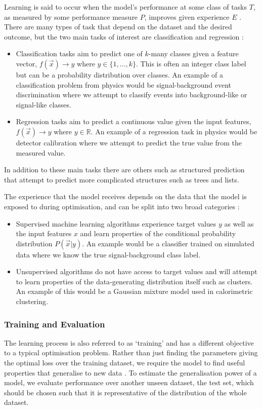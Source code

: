 Learning is said to occur when the model's performance at some class of tasks $T$, as measured by some performance measure $P$, improves given experience $E$ \cite{Learning}.
There are many types of task that depend on the dataset and the desired outcome, but the two main tasks of interest are classification and regression \cite{DeepLearningBook}:
\begin{itemize}[noitemsep]
    \item Classification tasks aim to predict one of $k$-many classes given a feature vector, $f(\vec{x})\rightarrow{}y$ where $y\in\{1,\dots,k\}$.
This is often an integer class label but can be a probability distribution over classes. An example of a classification problem from physics would be signal-background event discrimination where we attempt to classify events into background-like or signal-like classes.
    \item Regression tasks aim to predict a continuous value given the input features, $f(\vec{x})\rightarrow{}y$ where $y\in\mathds{R}$. An example of a regression task in physics would be detector calibration where we attempt to predict the true value from the measured value. 
\end{itemize}
In addition to these main tasks there are others such as structured prediction that attempt to predict more complicated structures such as trees and lists.


The experience that the model receives depends on the data that the model is exposed to during optimisation, and can be split into two broad categories \cite{DeepLearningBook}:
\begin{itemize}[noitemsep]
    \item Supervised machine learning algorithms experience target values $y$ as well as the input features $x$ and learn properties of the conditional probability distribution $P(\vec{x}|y)$.  
          An example would be a classifier trained on simulated data where we know the true signal-background class label. 
    \item Unsupervised algorithms do not have access to target values and will attempt to learn properties of the data-generating distribution itself such as clusters.
          An example of this would be a Gaussian mixture model used in calorimetric clustering.
\end{itemize}



\subsubsection{Training and Evaluation}
The learning process is also referred to as `training' and has a different objective to a typical optimisation problem. Rather than just finding the parameters giving the optimal loss over the training dataset, we require the model to find useful properties that generalise to new data \cite{DeepLearningBook}. 
To estimate the generalisation power of a model, we evaluate performance over another unseen dataset, the test set, which should be chosen such that it is representative of the distribution of the whole dataset.


